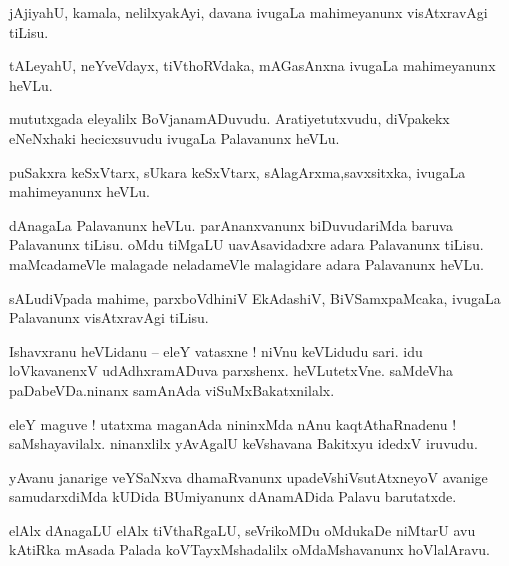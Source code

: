 \documentclass{article}
\begin{document}
\begin{mn}%
jAjiyahU, kamala, nelilxyakAyi, davana ivugaLa mahimeyanunx visAtxravAgi tiLisu.
\end{mn}

\begin{mn}%
tALeyahU, neYveVdayx, tiVthoRVdaka, mAGasAnxna ivugaLa mahimeyanunx heVLu.
\end{mn}

\begin{mn}%
mututxgada eleyalilx BoVjanamADuvudu. Aratiyetutxvudu, diVpakekx eNeNxhaki hecicxsuvudu ivugaLa 
Palavanunx heVLu.
\end{mn}

\begin{mn}%
puSakxra keSxVtarx, sUkara keSxVtarx, sAlagArxma,savxsitxka, ivugaLa mahimeyanunx heVLu.
\end{mn}

\begin{mn}%
dAnagaLa Palavanunx heVLu. parAnanxvanunx biDuvudariMda baruva Palavanunx tiLisu. oMdu tiMgaLU 
uavAsavidadxre adara Palavanunx tiLisu. maMcadameVle malagade neladameVle malagidare adara 
Palavanunx heVLu.
\end{mn}

\begin{mn}%
sALudiVpada mahime, parxboVdhiniV EkAdashiV, BiVSamxpaMcaka, ivugaLa Palavanunx visAtxravAgi tiLisu. 
\end{mn}

\begin{mn}%
Ishavxranu heVLidanu -- eleY vatasxne ! niVnu keVLidudu sari. idu loVkavanenxV udAdhxramADuva 
parxshenx. heVLutetxVne. saMdeVha paDabeVDa.ninanx samAnAda viSuMxBakatxnilalx.
\end{mn}

\begin{mn}%
eleY maguve ! utatxma maganAda nininxMda nAnu kaqtAthaRnadenu ! saMshayavilalx. ninanxlilx 
yAvAgalU keVshavana Bakitxyu idedxV iruvudu.
\end{mn}

\begin{mn}%
yAvanu janarige veYSaNxva dhamaRvanunx upadeVshiVsutAtxneyoV avanige samudarxdiMda kUDida 
BUmiyanunx dAnamADida Palavu barutatxde.
\end{mn}

\begin{mn}%
elAlx dAnagaLU elAlx tiVthaRgaLU, seVrikoMDu oMdukaDe niMtarU avu kAtiRka mAsada Palada 
koVTayxMshadalilx oMdaMshavanunx hoVlalAravu.
\end{mn}
\end{document}
